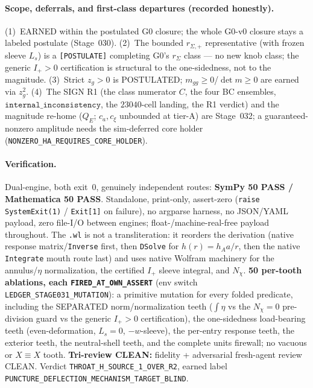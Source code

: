 \paragraph{Scope, deferrals, and first-class departures (recorded honestly).}
(1)~EARNED within the postulated G0 closure; the whole G0-v0 closure stays a
labeled postulate (Stage~030). (2)~The bounded \(r_{\Sigma,+}\) representative
(with frozen sleeve \(L_s\)) is a \texttt{[POSTULATE]} completing G0's
\(r_\Sigma\) class --- no new knob class; the generic \(I_+>0\) certification is
structural to the one-sidedness, not to the magnitude. (3)~Strict \(z_g>0\) is
POSTULATED; \(m_{gg}\ge0\)/\(\det m\ge0\) are earned via \(z_g^2\). (4)~The SIGN
R1 (the class numerator \(C\), the four BC ensembles,
\(\texttt{internal\_inconsistency}\), the \(23040\)-cell landing, the R1 verdict)
and the magnitude re-home (\(Q_E\); \(c_a,c_\xi\) unbounded at tier-A) are
Stage~032; a guaranteed-nonzero amplitude needs the sim-deferred core holder
(\texttt{NONZERO\_HA\_REQUIRES\_CORE\_HOLDER}).

\paragraph{Verification.}
Dual-engine, both exit~0, genuinely independent routes:
\textbf{SymPy 50 PASS / Mathematica 50 PASS}. Standalone, print-only, assert-zero
(\texttt{raise SystemExit(1)} / \texttt{Exit[1]} on failure), no argparse harness,
no JSON/YAML payload, zero file-I/O between engines; float-/machine-real-free
payload throughout. The \texttt{.wl} is not a transliteration: it reorders the
derivation (native response matrix/\texttt{Inverse} first, then \texttt{DSolve}
for \(h(r)=h_A a/r\), then the native \texttt{Integrate} mouth route last) and
uses native Wolfram machinery for the annulus/\(\eta\) normalization, the
certified \(I_+\) sleeve integral, and \(N_\chi\). \textbf{50 per-tooth
ablations, each \texttt{FIRED\_AT\_OWN\_ASSERT}} (env switch
\texttt{LEDGER\_STAGE031\_MUTATION}): a primitive mutation for every folded
predicate, including the SEPARATED norm/normalization teeth (\(\int\eta\) vs the
\(N_\chi=0\) pre-division guard vs the generic \(I_+>0\) certification), the
one-sidedness load-bearing teeth (even-deformation, \(L_s=0\), \(-w\)-sleeve), the
per-entry response teeth, the exterior teeth, the neutral-shell teeth, and the
complete units firewall; no vacuous or \(X\equiv X\) tooth. \textbf{Tri-review
CLEAN:} fidelity + adversarial fresh-agent review CLEAN. Verdict
\texttt{THROAT\_H\_SOURCE\_1\_OVER\_R2}, earned label
\texttt{PUNCTURE\_DEFLECTION\_MECHANISM\_TARGET\_BLIND}.
